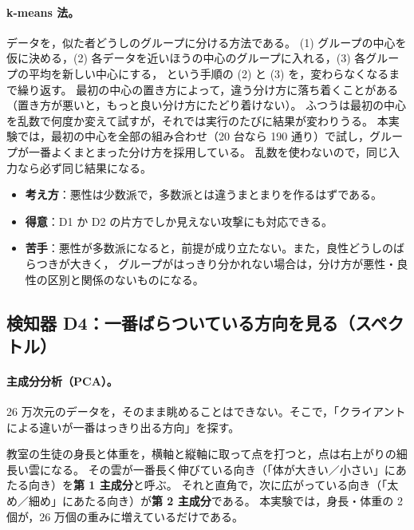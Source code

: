 \documentclass[a4j, dvipdfmx]{jsarticle}  %
\begin{document}
\paragraph{k-means 法。}
データを，似た者どうしのグループに分ける方法である。
(1) グループの中心を仮に決める，(2) 各データを近いほうの中心のグループに入れる，(3) 各グループの平均を新しい中心にする，
という手順の (2) と (3) を，変わらなくなるまで繰り返す。
最初の中心の置き方によって，違う分け方に落ち着くことがある（置き方が悪いと，もっと良い分け方にたどり着けない）。
ふつうは最初の中心を乱数で何度か変えて試すが，それでは実行のたびに結果が変わりうる。
本実験では，最初の中心を全部の組み合わせ（20 台なら 190 通り）で試し，グループが一番よくまとまった分け方を採用している。
乱数を使わないので，同じ入力なら必ず同じ結果になる。

\begin{itemize}
  \item \textbf{考え方}：悪性は少数派で，多数派とは違うまとまりを作るはずである。
  \item \textbf{得意}：D1 か D2 の片方でしか見えない攻撃にも対応できる。
  \item \textbf{苦手}：悪性が多数派になると，前提が成り立たない。また，良性どうしのばらつきが大きく，
        グループがはっきり分かれない場合は，分け方が悪性・良性の区別と関係のないものになる。
\end{itemize}

\subsection{検知器 D4：一番ばらついている方向を見る（スペクトル）}
\label{sec:d4}

\paragraph{主成分分析（PCA）。}
26 万次元のデータを，そのまま眺めることはできない。そこで，「クライアントによる違いが一番はっきり出る方向」を探す。

教室の生徒の身長と体重を，横軸と縦軸に取って点を打つと，点は右上がりの細長い雲になる。
その雲が一番長く伸びている向き（「体が大きい／小さい」にあたる向き）を\textbf{第 1 主成分}と呼ぶ。
それと直角で，次に広がっている向き（「太め／細め」にあたる向き）が\textbf{第 2 主成分}である。
本実験では，身長・体重の 2 個が，26 万個の重みに増えているだけである。
\end{document}
